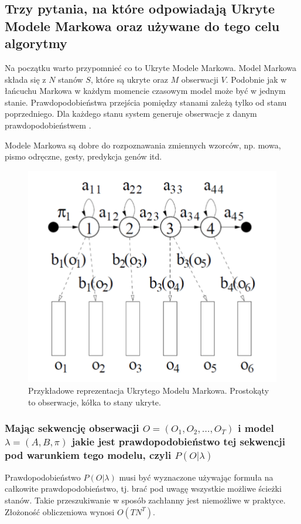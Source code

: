 \documentclass[wi]{zut}
\begin{document}
\subsection{Trzy pytania, na które odpowiadają Ukryte Modele Markowa oraz używane do tego celu algorytmy}

Na początku warto przypomnieć co to Ukryte Modele Markowa. Model Markowa składa się z $N$ stanów $S$, które są ukryte oraz $M$ obserwacji $V$. Podobnie jak w łańcuchu Markowa w każdym momencie czasowym model może być w jednym stanie. Prawdopodobieństwa przejścia pomiędzy stanami zależą tylko od stanu poprzedniego. Dla każdego stanu system generuje obserwacje z danym prawdopodobieństwem \cite{Pietrzykowski2020}. 

Modele Markowa są dobre do rozpoznawania zmiennych wzorców, np. mowa, pismo odręczne, gesty, predykcja genów itd.\cite{Pietrzykowski2020}

\begin{figure}[H]
    \centering
    \includegraphics[width=0.5\linewidth]{images/hidden_markov.png}
    \caption{Przykładowe reprezentacja Ukrytego Modelu Markowa. Prostokąty to obserwacje, kółka to stany ukryte.}
    \label{fig:pdgd}
\end{figure}

\subsubsection{Mając sekwencję obserwacji $O = (O_1, O_2, \ldots, O_T)$ i model $\lambda = (A, B, \pi)$ jakie jest prawdopodobieństwo tej sekwencji pod warunkiem tego modelu, czyli $P(O|\lambda)$}

Prawdopodobieństwo $P(O|\lambda)$ musi być wyznaczone używając formuła na całkowite prawdopodobieństwo, tj. brać pod uwagę wszystkie możliwe ścieżki stanów. Takie przeszukiwanie w sposób zachłanny jest niemożliwe w praktyce. Złożoność obliczeniowa wynosi $O(TN^T)$\cite{Pietrzykowski2020}. 
\end{document}
